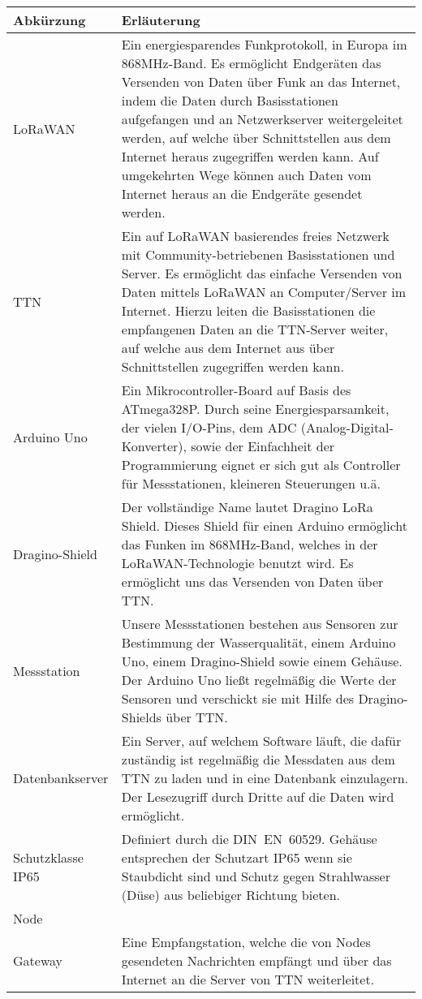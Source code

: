 \documentclass[
11pt,
a4paper,
ngerman,
]{article}
\begin{document}
\begin{table}[H]
	\begin{tabularx}{\textwidth}{ |l|X| }
		\hline  %
		\rowcolor[gray]{.8}%
		\rule{0pt}{18pt}%
		\textbf{Abkürzung} & \textbf{Erläuterung} \\
		\hline  %
		LoRaWAN & Ein energiesparendes Funkprotokoll, in Europa im 868MHz-Band. Es ermöglicht Endgeräten das Versenden von Daten über Funk an das Internet, indem die Daten durch Basisstationen aufgefangen und an Netzwerkserver weitergeleitet werden, auf welche über Schnittstellen aus dem Internet heraus zugegriffen werden kann. Auf umgekehrten Wege können auch Daten vom Internet heraus an die Endgeräte gesendet werden. \\
		\hline
		TTN & Ein auf LoRaWAN basierendes freies Netzwerk mit Community-betriebenen Basisstationen und Server. Es ermöglicht das einfache Versenden von Daten mittels LoRaWAN an Computer/Server im Internet. Hierzu leiten die Basisstationen die empfangenen Daten an die TTN-Server weiter, auf welche aus dem Internet aus über Schnittstellen zugegriffen werden kann. \\
		\hline
		Arduino Uno & Ein Mikrocontroller-Board auf Basis des ATmega328P. Durch seine Energiesparsamkeit, der vielen I/O-Pins, dem ADC (Analog-Digital-Konverter), sowie der Einfachheit der Programmierung eignet er sich gut als Controller für Messstationen, kleineren Steuerungen u.ä. \\
		\hline
		Dragino-Shield & Der vollständige Name lautet Dragino LoRa Shield. Dieses Shield für einen Arduino ermöglicht das Funken im 868MHz-Band, welches in der LoRaWAN-Technologie benutzt wird. Es ermöglicht uns das Versenden von Daten über TTN. \\
		\hline
		Messstation & Unsere Messstationen bestehen aus Sensoren zur Bestimmung der Wasserqualität, einem Arduino Uno, einem Dragino-Shield sowie einem Gehäuse. Der Arduino Uno ließt regelmäßig die Werte der Sensoren und verschickt sie mit Hilfe des Dragino-Shields über TTN. \\
		\hline
		Datenbankserver & Ein Server, auf welchem Software läuft, die dafür zuständig ist regelmäßig die Messdaten aus dem TTN zu laden und in eine Datenbank einzulagern. Der Lesezugriff durch Dritte auf die Daten wird ermöglicht. \\
		\hline
		Schutzklasse IP65 & Definiert durch die DIN~EN~60529. Gehäuse entsprechen der Schutzart IP65 wenn sie Staubdicht sind und Schutz gegen Strahlwasser (Düse) aus beliebiger Richtung bieten. \\
		\hline
		Node &  \\
		\hline
		Gateway & Eine Empfangstation, welche die von Nodes gesendeten Nachrichten empfängt und über das Internet an die Server von TTN weiterleitet. \\
		\hline
	\end{tabularx}
\end{table}
\end{document}
